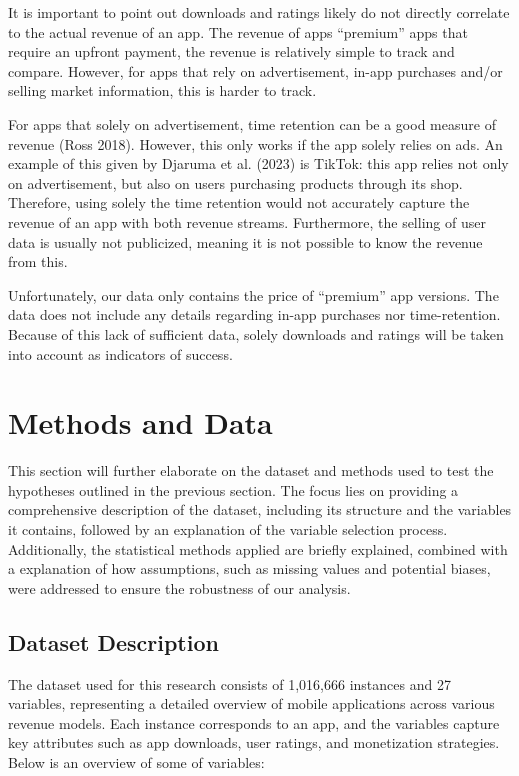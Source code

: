\documentclass[
  12pt,
  a4paper,
]{article}
\begin{document}
It is important to point out downloads and ratings likely do not
directly correlate to the actual revenue of an app. The revenue of apps
``premium'' apps that require an upfront payment, the revenue is
relatively simple to track and compare. However, for apps that rely on
advertisement, in-app purchases and/or selling market information, this
is harder to track.

For apps that solely on advertisement, time retention can be a good
measure of revenue (Ross 2018). However, this only works if the app
solely relies on ads. An example of this given by Djaruma et al. (2023)
is TikTok: this app relies not only on advertisement, but also on users
purchasing products through its shop. Therefore, using solely the time
retention would not accurately capture the revenue of an app with both
revenue streams. Furthermore, the selling of user data is usually not
publicized, meaning it is not possible to know the revenue from this.

Unfortunately, our data only contains the price of ``premium'' app
versions. The data does not include any details regarding in-app
purchases nor time-retention. Because of this lack of sufficient data,
solely downloads and ratings will be taken into account as indicators of
success.

\section{\texorpdfstring{Methods and Data
}{Methods and Data }}\label{methods-and-data}

This section will further elaborate on the dataset and methods used to
test the hypotheses outlined in the previous section. The focus lies on
providing a comprehensive description of the dataset, including its
structure and the variables it contains, followed by an explanation of
the variable selection process. Additionally, the statistical methods
applied are briefly explained, combined with a explanation of how
assumptions, such as missing values and potential biases, were addressed
to ensure the robustness of our analysis.

\subsection{Dataset Description}\label{dataset-description}

The dataset used for this research consists of 1,016,666 instances and
27 variables, representing a detailed overview of mobile applications
across various revenue models. Each instance corresponds to an app, and
the variables capture key attributes such as app downloads, user
ratings, and monetization strategies. Below is an overview of some of
variables:
\end{document}
